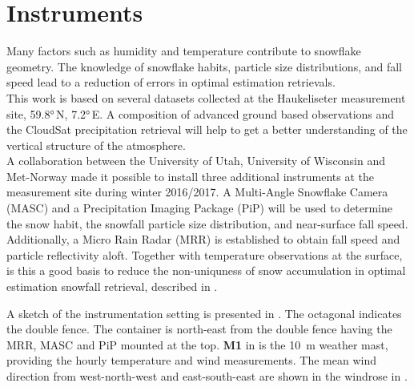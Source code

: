 \section{Instruments} \label{sec:DIM}


Many factors such as humidity and temperature contribute to snowflake geometry. The knowledge of snowflake habits, particle size distributions, and fall speed lead to a reduction of errors in optimal estimation retrievals. \\
This work is based on several datasets collected at the Haukeliseter measurement site, \ang{59.8}\,N, \ang{7.2}\,E. A composition of advanced ground based observations and the CloudSat precipitation retrieval will help to get a better understanding of the vertical structure of the atmosphere. 
\\
A collaboration between the University of Utah, University of Wisconsin and Met-Norway made it possible to install three additional instruments at the measurement site during winter 2016/2017. A Multi-Angle Snowflake Camera (MASC) and a Precipitation Imaging Package (PiP) will be used to determine the snow habit, the snowfall particle size distribution, and near-surface fall speed. Additionally, a Micro Rain Radar (MRR) is established to obtain fall speed and particle reflectivity aloft. Together with temperature observations at the surface, is this a good basis to reduce the non-uniquness of snow accumulation in optimal estimation snowfall retrieval, described in . 

\noindent
A sketch of the instrumentation setting is presented in . The octagonal indicates the double fence. The container is north-east from the double fence having the MRR, MASC and PiP mounted at the top. \textbf{M1} in  is the \SI{10}{\metre} weather mast, providing the hourly \cite{eklima_norwegian_2016} temperature and wind measurements. The mean wind direction from west-north-west and east-south-east are shown in the windrose in .
%
%
\pagebreak
